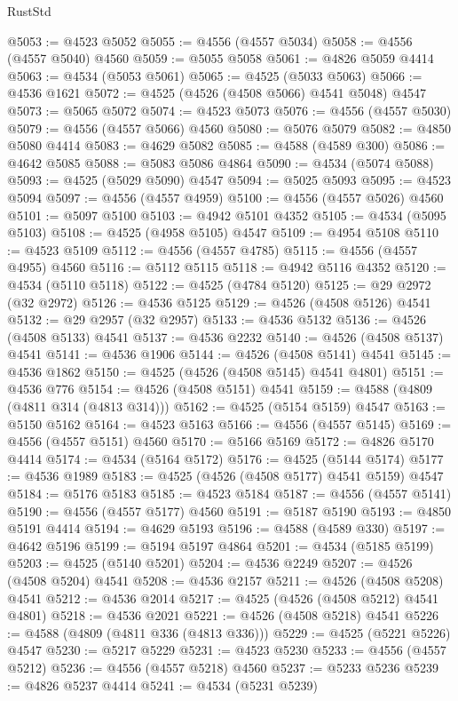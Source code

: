 \begin{lexlean}{RustStd}
\begin{coremodule}
@5053 := @4523 @5052
@5055 := @4556 (@4557 @5034)
@5058 := @4556 (@4557 @5040) @4560
@5059 := @5055 @5058
@5061 := @4826 @5059 @4414
@5063 := @4534 (@5053 @5061)
@5065 := @4525 (@5033 @5063)
@5066 := @4536 @1621
@5072 := @4525 (@4526 (@4508 @5066) @4541 @5048) @4547
@5073 := @5065 @5072
@5074 := @4523 @5073
@5076 := @4556 (@4557 @5030)
@5079 := @4556 (@4557 @5066) @4560
@5080 := @5076 @5079
@5082 := @4850 @5080 @4414
@5083 := @4629 @5082
@5085 := @4588 (@4589 @300)
@5086 := @4642 @5085
@5088 := @5083 @5086 @4864
@5090 := @4534 (@5074 @5088)
@5093 := @4525 (@5029 @5090) @4547
@5094 := @5025 @5093
@5095 := @4523 @5094
@5097 := @4556 (@4557 @4959)
@5100 := @4556 (@4557 @5026) @4560
@5101 := @5097 @5100
@5103 := @4942 @5101 @4352
@5105 := @4534 (@5095 @5103)
@5108 := @4525 (@4958 @5105) @4547
@5109 := @4954 @5108
@5110 := @4523 @5109
@5112 := @4556 (@4557 @4785)
@5115 := @4556 (@4557 @4955) @4560
@5116 := @5112 @5115
@5118 := @4942 @5116 @4352
@5120 := @4534 (@5110 @5118)
@5122 := @4525 (@4784 @5120)
@5125 := @29 @2972 (@32 @2972)
@5126 := @4536 @5125
@5129 := @4526 (@4508 @5126) @4541
@5132 := @29 @2957 (@32 @2957)
@5133 := @4536 @5132
@5136 := @4526 (@4508 @5133) @4541
@5137 := @4536 @2232
@5140 := @4526 (@4508 @5137) @4541
@5141 := @4536 @1906
@5144 := @4526 (@4508 @5141) @4541
@5145 := @4536 @1862
@5150 := @4525 (@4526 (@4508 @5145) @4541 @4801)
@5151 := @4536 @776
@5154 := @4526 (@4508 @5151) @4541
@5159 := @4588 (@4809 (@4811 @314 (@4813 @314)))
@5162 := @4525 (@5154 @5159) @4547
@5163 := @5150 @5162
@5164 := @4523 @5163
@5166 := @4556 (@4557 @5145)
@5169 := @4556 (@4557 @5151) @4560
@5170 := @5166 @5169
@5172 := @4826 @5170 @4414
@5174 := @4534 (@5164 @5172)
@5176 := @4525 (@5144 @5174)
@5177 := @4536 @1989
@5183 := @4525 (@4526 (@4508 @5177) @4541 @5159) @4547
@5184 := @5176 @5183
@5185 := @4523 @5184
@5187 := @4556 (@4557 @5141)
@5190 := @4556 (@4557 @5177) @4560
@5191 := @5187 @5190
@5193 := @4850 @5191 @4414
@5194 := @4629 @5193
@5196 := @4588 (@4589 @330)
@5197 := @4642 @5196
@5199 := @5194 @5197 @4864
@5201 := @4534 (@5185 @5199)
@5203 := @4525 (@5140 @5201)
@5204 := @4536 @2249
@5207 := @4526 (@4508 @5204) @4541
@5208 := @4536 @2157
@5211 := @4526 (@4508 @5208) @4541
@5212 := @4536 @2014
@5217 := @4525 (@4526 (@4508 @5212) @4541 @4801)
@5218 := @4536 @2021
@5221 := @4526 (@4508 @5218) @4541
@5226 := @4588 (@4809 (@4811 @336 (@4813 @336)))
@5229 := @4525 (@5221 @5226) @4547
@5230 := @5217 @5229
@5231 := @4523 @5230
@5233 := @4556 (@4557 @5212)
@5236 := @4556 (@4557 @5218) @4560
@5237 := @5233 @5236
@5239 := @4826 @5237 @4414
@5241 := @4534 (@5231 @5239)

\end{coremodule}
\end{lexlean}
